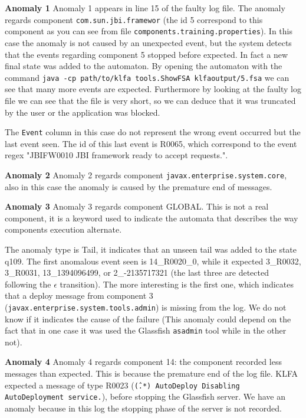 \textbf{Anomaly 1}
Anomaly 1 appears in line 15 of the faulty log file. The anomaly
regards
 component \texttt{com.sun.jbi.framewor} 
(the id 5 correspond to
this component as you can see from file
\texttt{components.training.properties}). In this case the anomaly is
not caused by an unexpected event, but the system detects that the
events regarding component 5 stopped before expected. In fact a
new final state was added to the automaton.
By opening the automaton with the command \texttt{java -cp
path/to/klfa
tools.ShowFSA klfaoutput/5.fsa} we can see that many more events are
expected. Furthermore by looking at the faulty log file we can see
that the file is very short, so we can deduce that it was truncated
by the user or the application was blocked.

The \texttt{Event} column
in this case do not represent the wrong event occurred but the last
event seen. The id of this last event is R0065, which correspond to
the event regex
"JBIFW0010 JBI framework ready to accept requests.". 

\textbf{Anomaly 2} 
Anomaly 2 regards component \texttt{javax.enter\-prise.system.core},
also in this case the anomaly is caused by the premature end of
messages.

\textbf{Anomaly 3} 
Anomaly 3 regards component GLOBAL. This is not a real component, it
is a keyword used to indicate the automata that describes the way
components execution alternate.

The anomaly type is Tail, it indicates that an unseen tail was added
to the state q109. The first anomalous event seen is 14\_R0020\_0,
while it expected 3\_R0032, 3\_R0031, 13\_1394096499, or
2\_-2135717321
(the last three are detected following the $\epsilon$ transition).
The more interesting is the first one, which indicates that a deploy
message from component 3
(\texttt{javax.enterprise.system.to\-ols.admin}) is
missing from the log. We do not know if it indicates the cause of the
failure (This anomaly could depend on the fact that in one case it was used
the Glassfish \texttt{asadmin} tool while in the other not).

\textbf{Anomaly 4} 
Anomaly 4 regards component 14: the component recorded
less messages than expected. This is because the premature end of the
log file. KLFA expected a message of type R0023 (\texttt{\^(.*)
AutoDeploy Disabling AutoDeployment service.}), before
stopping the Glassfish server. We have an anomaly because in this log the
stopping phase of the server is not recorded.

